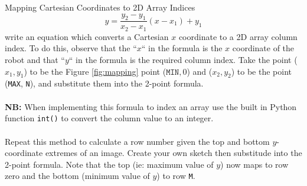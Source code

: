 \documentclass{lab}
\begin{document}
\begin{task}{Mapping Cartesian Coordinates to 2D Array Indices}{}
\begin{equation}
y = \frac{y_2 - y_1}{x_2 - x_1}(x-x_1)+y_1
\end{equation}
write an equation which converts a Cartesian $x$ coordinate to a 2D array column index. To do this, observe that the ``$x$`` in the formula is the $x$ coordinate of the robot and that ``$y$`` in the formula is the required column index. Take the point ($x_1,y_1$) to be the Figure \ref{fig:mapping} point ($\texttt{MIN}, 0$) and ($x_2,y_2$) to be the point (\texttt{MAX}, \texttt{N}), and substitute them into the 2-point formula.
\\~\\
\textbf{NB:} When implementing this formula to index an array use the built in Python function \texttt{int()} to convert the column value to an integer.
\\~\\
Repeat this method to calculate a row number given the top and bottom $y$-coordinate extremes of an image. Create your own sketch then substitude into the 2-point formula. Note that the top (ie: maximum value of $y$) now maps to row zero and the bottom (minimum value of $y$) to row \texttt{M}.
\end{task}
\end{document}
